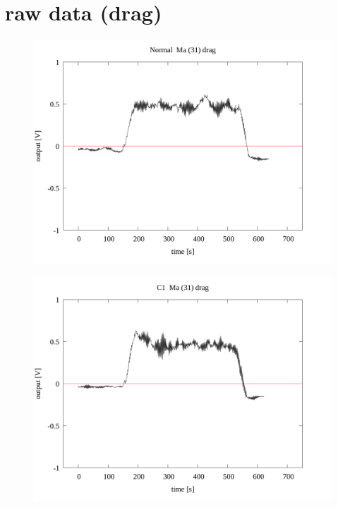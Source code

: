 \documentclass[a4paper]{jsarticle}
\author{}
\title{}
\date{}
\begin{document}
\section{raw data (drag)}

\begin{figure}[htbp]
    \footnotesize
    \begin{center}
        \includegraphics[width=140mm]{../../../33_result/210806/moving_average/31/drag/Normal_ma(31)_drag.png}
    \end{center}
\end{figure}

\begin{figure}[htbp]
    \footnotesize
    \begin{center}
        \includegraphics[width=140mm]{../../../33_result/210806/moving_average/31/drag/C1_ma(31)_drag.png}
    \end{center}
\end{figure}
\end{document}
